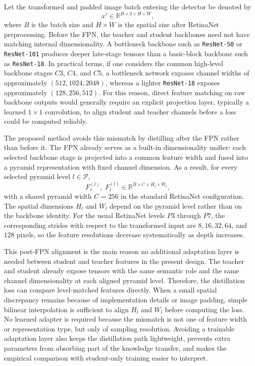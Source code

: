 Let the transformed and padded image batch entering the detector be denoted by
\begin{equation}
  x' \in \mathbb{R}^{B \times 3 \times H \times W},
\end{equation}
where $B$ is the batch size and $H \times W$ is the spatial size after RetinaNet preprocessing. Before the FPN, the teacher and student backbones need not have matching internal dimensionality. A bottleneck backbone such as \texttt{ResNet-50} or \texttt{ResNet-101} produces deeper late-stage tensors than a basic-block backbone such as \texttt{ResNet-18}. In practical terms, if one considers the common high-level backbone stages $C3$, $C4$, and $C5$, a bottleneck network exposes channel widths of approximately $(512,1024,2048)$, whereas a lighter \texttt{ResNet-18} exposes approximately $(128,256,512)$. For this reason, direct feature matching on raw backbone outputs would generally require an explicit projection layer, typically a learned $1 \times 1$ convolution, to align student and teacher channels before a loss could be computed reliably.

The proposed method avoids this mismatch by distilling after the FPN rather than before it. The FPN already serves as a built-in dimensionality unifier: each selected backbone stage is projected into a common feature width and fused into a pyramid representation with fixed channel dimension. As a result, for every selected pyramid level $l \in \mathcal{P}$,
\begin{equation}
  F_s^{(l)},\; F_t^{(l)} \in \mathbb{R}^{B \times C \times H_l \times W_l},
\end{equation}
with a shared pyramid width $C=256$ in the standard RetinaNet configuration. The spatial dimensions $H_l$ and $W_l$ depend on the pyramid level rather than on the backbone identity. For the usual RetinaNet levels $P3$ through $P7$, the corresponding strides with respect to the transformed input are $8,16,32,64$, and $128$ pixels, so the feature resolutions decrease systematically as depth increases.

This post-FPN alignment is the main reason no additional adaptation layer is needed between student and teacher features in the present design. The teacher and student already expose tensors with the same semantic role and the same channel dimensionality at each aligned pyramid level. Therefore, the distillation loss can compare level-matched features directly. When a small spatial discrepancy remains because of implementation details or image padding, simple bilinear interpolation is sufficient to align $H_l$ and $W_l$ before computing the loss. No learned adapter is required because the mismatch is not one of feature width or representation type, but only of sampling resolution. Avoiding a trainable adaptation layer also keeps the distillation path lightweight, prevents extra parameters from absorbing part of the knowledge transfer, and makes the empirical comparison with student-only training easier to interpret.
